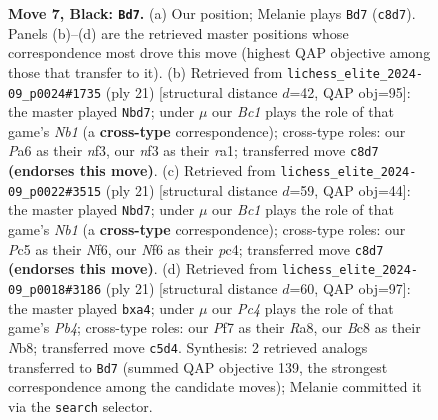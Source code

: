 \documentclass[11pt]{article}
\begin{document}
\begin{figure}[p]
\caption{\textbf{Move 7, Black: \texttt{Bd7}.} (a) Our position; Melanie plays \texttt{Bd7} (\texttt{c8d7}). Panels (b)--(d) are the retrieved master positions whose correspondence most drove this move (highest QAP objective among those that transfer to it). (b) Retrieved from \texttt{lichess\_elite\_2024-09\_p0024\#1735} (ply 21) [structural distance $d$=42, QAP obj=95]: the master played \texttt{Nbd7}; under $\mu$ our \emph{Bc1} plays the role of that game's \emph{Nb1} (a \textbf{cross-type} correspondence); cross-type roles: our \emph{P}a6 as their \emph{n}f3, our \emph{n}f3 as their \emph{r}a1; transferred move \texttt{c8d7} \textbf{(endorses this move)}. (c) Retrieved from \texttt{lichess\_elite\_2024-09\_p0022\#3515} (ply 21) [structural distance $d$=59, QAP obj=44]: the master played \texttt{Nbd7}; under $\mu$ our \emph{Bc1} plays the role of that game's \emph{Nb1} (a \textbf{cross-type} correspondence); cross-type roles: our \emph{P}c5 as their \emph{N}f6, our \emph{N}f6 as their \emph{p}c4; transferred move \texttt{c8d7} \textbf{(endorses this move)}. (d) Retrieved from \texttt{lichess\_elite\_2024-09\_p0018\#3186} (ply 21) [structural distance $d$=60, QAP obj=97]: the master played \texttt{bxa4}; under $\mu$ our \emph{Pc4} plays the role of that game's \emph{Pb4}; cross-type roles: our \emph{P}f7 as their \emph{R}a8, our \emph{B}c8 as their \emph{N}b8; transferred move \texttt{c5d4}. Synthesis: 2 retrieved analogs transferred to \texttt{Bd7} (summed QAP objective 139, the strongest correspondence among the candidate moves); Melanie committed it via the \texttt{search} selector.}
\label{fig:thought-m13}
\end{figure}

\clearpage
\end{document}
